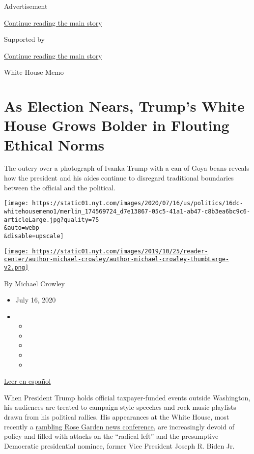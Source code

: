 Advertisement

\protect\hyperlink{after-top}{Continue reading the main story}

Supported by

\protect\hyperlink{after-sponsor}{Continue reading the main story}

White House Memo

\hypertarget{as-election-nears-trumps-white-house-grows-bolder-in-flouting-ethical-norms}{%
\section{As Election Nears, Trump's White House Grows Bolder in Flouting
Ethical
Norms}\label{as-election-nears-trumps-white-house-grows-bolder-in-flouting-ethical-norms}}

The outcry over a photograph of Ivanka Trump with a can of Goya beans
reveals how the president and his aides continue to disregard
traditional boundaries between the official and the political.

\texttt{[image: https://static01.nyt.com/images/2020/07/16/us/politics/16dc-whitehousememo1/merlin\_174569724\_d7e13867-05c5-41a1-ab47-c8b3ea6bc9c6-articleLarge.jpg?quality=75\\\&auto=webp\\\&disable=upscale]}

\href{https://www.nytimes.com/by/michael-crowley}{\texttt{[image: https://static01.nyt.com/images/2019/10/25/reader-center/author-michael-crowley/author-michael-crowley-thumbLarge-v2.png]}}

By \href{https://www.nytimes.com/by/michael-crowley}{Michael Crowley}

\begin{itemize}
\item
  July 16, 2020
\item
  \begin{itemize}
  \item
  \item
  \item
  \item
  \item
  \end{itemize}
\end{itemize}

\href{https://www.nytimes.com/es/2020/07/16/espanol/estados-unidos/goya-trump-ivanka.html}{Leer
en español}

When President Trump holds official taxpayer-funded events outside
Washington, his audiences are treated to campaign-style speeches and
rock music playlists drawn from his political rallies. His appearances
at the White House, most recently a
\href{https://www.nytimes.com/2020/07/14/us/politics/trump-news-conference.html?fbclid=IwAR3ztzy09muUUd91tiAoZL-C_rRdGiVBoSa5bHkbP0auF7H2KjU1gPL9WIM}{rambling
Rose Garden news conference}, are increasingly devoid of policy and
filled with attacks on the ``radical left'' and the presumptive
Democratic presidential nominee, former Vice President Joseph R. Biden
Jr.

